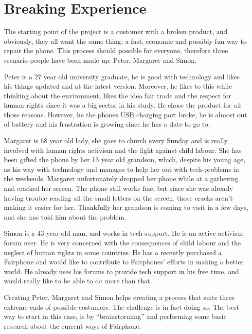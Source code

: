 \documentclass[final]{scrreprt} %
\begin{document}
\chapter{Breaking Experience}%
\label{ch:breaking-experience}
The starting point of the project is a customer with a broken product, and obviously, they all want the same thing: a fast, economic and possibly fun way to repair the phone. This process should possible for everyone, therefore three scenario people have been made up: Peter, Margaret and Simon.

Peter is a 27 year old university graduate, he is good with technology and likes his things updated and at the latest version. Moreover, he likes to this while thinking about the environment, likes the idea fair trade and the respect for human rights since it was a big sector in his study. He chose the product for all those reasons. However, he the phones USB charging port broke, he is almost out of battery and his frustration is growing since he has a date to go to. 

Margaret is 68 year old lady, she goes to church every Sunday and is really involved with human rights activism and the fight against child labour. She has been gifted the phone by her 13 year old grandson, which, despite his young age, as his way with technology and manages to help her out with tech-problems in the weekends. Margaret unfortunately dropped her phone while at a gathering and cracked her screen. The phone still works fine, but since she was already having trouble reading all the small letters on the screen, those cracks aren't making it easier for her. Thankfully her grandson is coming to visit in a few days, and she has told him about the problem.

Simon is a 43 year old man, and works in tech support. He is an active activism-forum user. He is very concerned with the consequences of child labour and the neglect of human rights in some countries. He has a recently purchased a Fairphone and would like to contribute to Fairphones' efforts in making a better world. He already uses his forums to provide tech support in his free time, and would really like to be able to do more than that.

Creating Peter, Margaret and Simon helps creating a process that suits three extreme ends of possible costumers. The challenge is in fact doing so. The best way to start in this case, is by ``brainstorming'' and performing some basic research about the current ways of Fairphone.
\end{document}
